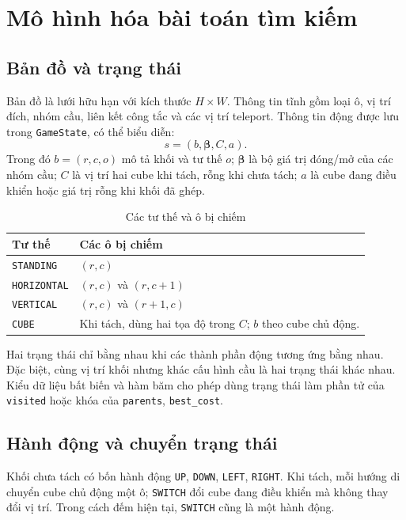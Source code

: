 
\section{Mô hình hóa bài toán tìm kiếm}
\subsection{Bản đồ và trạng thái}
Bản đồ là lưới hữu hạn với kích thước $H\times W$. Thông tin tĩnh gồm loại ô, vị trí đích, nhóm cầu, liên kết công tắc và các vị trí teleport. Thông tin động được lưu trong \texttt{GameState}, có thể biểu diễn:
\[
s=(b,\boldsymbol{\beta},C,a).
\]
Trong đó $b=(r,c,o)$ mô tả khối và tư thế $o$; $\boldsymbol{\beta}$ là bộ giá trị đóng/mở của các nhóm cầu; $C$ là vị trí hai cube khi tách, rỗng khi chưa tách; $a$ là cube đang điều khiển hoặc giá trị rỗng khi khối đã ghép.

\begin{table}[htbp]\centering
\caption{Các tư thế và ô bị chiếm}
\begin{tabularx}{\linewidth}{|l|Y|}
\hline Tư thế & Các ô bị chiếm\\\hline
\texttt{STANDING} & $(r,c)$\\\hline
\texttt{HORIZONTAL} & $(r,c)$ và $(r,c+1)$\\\hline
\texttt{VERTICAL} & $(r,c)$ và $(r+1,c)$\\\hline
\texttt{CUBE} & Khi tách, dùng hai tọa độ trong $C$; $b$ theo cube chủ động.\\\hline
\end{tabularx}
\end{table}
Hai trạng thái chỉ bằng nhau khi các thành phần động tương ứng bằng nhau. Đặc biệt, cùng vị trí khối nhưng khác cấu hình cầu là hai trạng thái khác nhau. Kiểu dữ liệu bất biến và hàm băm cho phép dùng trạng thái làm phần tử của \texttt{visited} hoặc khóa của \texttt{parents}, \texttt{best\_cost}.

\subsection{Hành động và chuyển trạng thái}
Khối chưa tách có bốn hành động \texttt{UP}, \texttt{DOWN}, \texttt{LEFT}, \texttt{RIGHT}. Khi tách, mỗi hướng di chuyển cube chủ động một ô; \texttt{SWITCH} đổi cube đang điều khiển mà không thay đổi vị trí. Trong cách đếm hiện tại, \texttt{SWITCH} cũng là một hành động.

